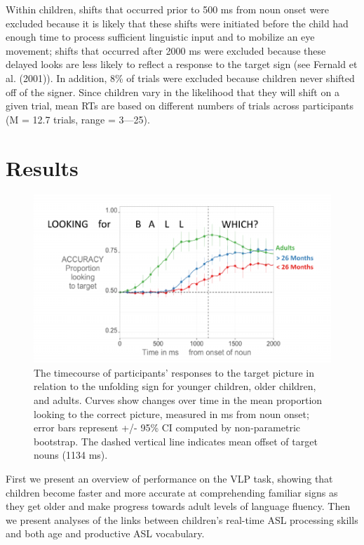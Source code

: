 \documentclass[12pt,]{article}
\begin{document}
Within children, shifts that occurred prior to 500 ms from noun onset
were excluded because it is likely that these shifts were initiated
before the child had enough time to process sufficient linguistic input
and to mobilize an eye movement; shifts that occurred after 2000 ms were
excluded because these delayed looks are less likely to reflect a
response to the target sign (see Fernald et al. (2001)). In addition,
8\% of trials were excluded because children never shifted off of the
signer. Since children vary in the likelihood that they will shift on a
given trial, mean RTs are based on different numbers of trials across
participants (M = 12.7 trials, range = 3---25).

\section{Results}\label{results}

\begin{figure}[htbp]
\centering
\includegraphics{Figs/profile plot png-1.pdf}
\caption{The timecourse of participants' responses to the target picture
in relation to the unfolding sign for younger children, older children,
and adults. Curves show changes over time in the mean proportion looking
to the correct picture, measured in ms from noun onset; error bars
represent +/- 95\% CI computed by non-parametric bootstrap. The dashed
vertical line indicates mean offset of target nouns (1134 ms).}
\end{figure}

First we present an overview of performance on the VLP task, showing
that children become faster and more accurate at comprehending familiar
signs as they get older and make progress towards adult levels of
language fluency. Then we present analyses of the links between
children's real-time ASL processing skills and both age and productive
ASL vocabulary.
\end{document}
